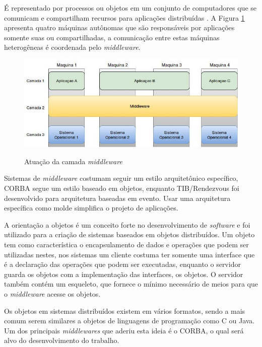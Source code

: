 	É representado por processos ou objetos em um conjunto de computadores que se comunicam e compartilham recursos para aplicações distribuídas \cite{Coulouris-2012}. A Figura \ref{fig:Tanenbaum-middleware} apresenta quatro máquinas autônomas que são responsáveis por aplicações somente suas ou compartilhadas, a comunicação entre estas máquinas heterogêneas é coordenada pelo \textit{middleware}. 
		
	\begin{figure}[htb]
		\caption{Atuação da camada \textit{middleware}}
		{\parbox{6cm}{
				\includegraphics[width=14cm]{images/middleware.jpeg}
				\label{fig:Tanenbaum-middleware}
		}}
	\end{figure}

	Sistemas de \textit{middleware} costumam seguir um estilo arquitetônico específico, CORBA segue um estilo baseado em objetos, enquanto TIB/Rendezvous foi desenvolvido para arquitetura baseadas em evento. Usar uma arquitetura específica como molde simplifica o projeto de aplicações.
	
	A orientação a objetos é um conceito forte no desenvolvimento de \textit{software} e foi utilizado para a criação de sistemas baseados em objetos distribuídos. Um objeto tem como característica o encapsulamento de dados e operações que podem ser utilizadas nestes, nos sistemas um cliente costuma ter somente uma interface que é a declaração das operações que podem ser executadas, enquanto o servidor guarda os objetos com a implementação das interfaces, os objetos. O servidor também contém um esqueleto, que fornece o mínimo necessário de meios para que o \textit{middleware} acesse os objetos.
	
	Os objetos em sistemas distribuídos existem em vários formatos, sendo a mais comum serem similares a objetos de linguagens de programação como C ou Java. Um dos principais \textit{middlewares} que aderiu esta ideia é o CORBA, o qual será alvo do desenvolvimento do trabalho.
	
